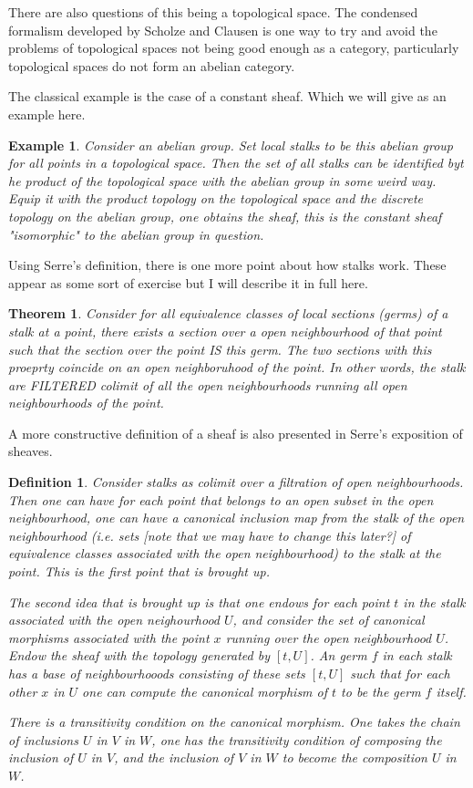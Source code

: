 \documentclass[12pt]{article}
\newtheorem{definition}{Definition}
\newtheorem{theorem}{Theorem}
\newtheorem{example}{Example}
\begin{document}
There are also questions of this being a topological space. The condensed formalism developed by Scholze and Clausen is one way to try and avoid the problems of topological spaces not being good enough as a category, particularly topological spaces do not form an abelian category.

The classical example is the case of a constant sheaf. Which we will give as an example here.

\begin{example}
    Consider an abelian group. Set local stalks to be this abelian group for all points in a topological space. Then the set of all stalks can be identified byt he product of the topological space with the abelian group in some weird way. Equip it with the product topology on the topological space and the discrete topology on the abelian group, one obtains the sheaf, this is the constant sheaf "isomorphic" to the abelian group in question.
\end{example}

Using Serre's definition, there is one more point about how stalks work. These appear as some sort of exercise but I will describe it in full here.

\begin{theorem}
    Consider for all equivalence classes of local sections (germs) of a stalk at a point, there exists a section over a open neighbourhood of that point such that the section over the point IS this germ. The two sections with this proeprty coincide on an open neighboruhood of the point. In other words, the stalk are FILTERED colimit of all the open neighbourhoods running all open neighbourhoods of the point.
\end{theorem}

A more constructive definition of a sheaf is also presented in Serre's exposition of sheaves.

\begin{definition}
    Consider stalks as colimit over a filtration of open neighbourhoods. Then one can have for each point that belongs to an open subset in the open neighbourhood, one can have a canonical inclusion map from the stalk of the open neighbourhood (i.e. sets [note that we may have to change this later?] of equivalence classes associated with the open neighbourhood) to the stalk at the point. This is the first point that is brought up.

    The second idea that is brought up is that one endows for each point $t$ in the stalk associated with the open neighourhood $U$, and consider the set of canonical morphisms associated with the point $x$ running over the open neighbourhood $U$. Endow the sheaf with the topology generated by $[t,U]$. An germ $f$ in each stalk has a base of neighbourhooods consisting of these sets $[t, U]$ such that for each other $x$ in $U$ one can compute the canonical morphism of $t$ to be the germ $f$ itself.

    There is a transitivity condition on the canonical morphism. One takes the chain of inclusions $U$ in $V$ in $W$, one has the transitivity condition of composing the inclusion of $U$ in $V$, and the inclusion of $V$ in $W$ to become the composition $U$ in $W$.
\end{definition}
\end{document}
